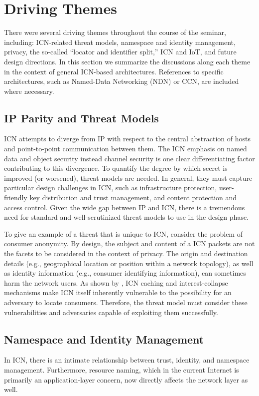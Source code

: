 \section{Driving Themes} \label{sec:themes}
There were several driving themes throughout the course of the seminar, including:
ICN-related threat models, namespace and identity management, privacy, the
so-called ``locator and identifier split,'' ICN and IoT, and future design directions.
In this section we summarize the discussions along each theme in the context
of general ICN-based architectures. References to specific architectures, such as
Named-Data Networking (NDN) or CCN, are included where necessary.

\subsection{IP Parity and Threat Models}
ICN attempts to diverge from IP with respect
to the central abstraction of hosts and point-to-point communication between
them. The ICN emphasis on named data and object security instead channel security
is one clear differentiating factor contributing to this divergence. To quantify
the degree by which secret is improved (or worsened), threat models are needed.
In general, they must capture particular design challenges in ICN, such as
infrastructure protection, user-friendly key distribution and trust management, and
content protection and access control.  Given the wide gap between IP and ICN,
there is a tremendous need for standard and well-scrutinized threat models to use in the design phase.

To give an example of a threat that is unique to ICN, consider the
problem of consumer anonymity. By design, the subject and content
of a ICN packets are not the facets to be considered in the context of privacy.
The origin and destination details (e.g., geographical location or position within a network
topology), as well as identity information (e.g., consumer identifying information),
can sometimes harm the network users. As shown by \cite{compagno2015violating}, ICN caching and
interest-collapse mechanisms make ICN itself inherently vulnerable to the possibility for an
adversary to locate consumers. Therefore, the threat model must consider these vulnerabilities
and adversaries capable of exploiting them successfully.

\subsection{Namespace and Identity Management}
In ICN, there is an intimate relationship between trust, identity, and namespace management.
Furthermore, resource naming, which in the current Internet is primarily an application-layer
concern, now directly affects the network layer as well.

